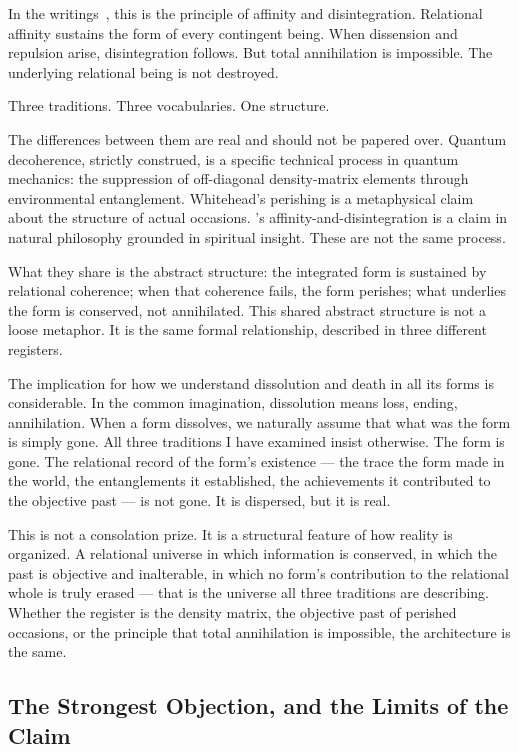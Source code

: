 In the \bahai writings~\citep[Talks 38, 41]{PUP}, this is the principle of affinity and disintegration.
Relational affinity sustains the form of every contingent being.
When dissension and repulsion arise, disintegration follows.
But total annihilation is impossible.
The underlying relational being is not destroyed.

Three traditions.
Three vocabularies.
One structure.

The differences between them are real and should not be papered over.
Quantum decoherence, strictly construed, is a specific technical process in quantum mechanics: the suppression of off-diagonal density-matrix elements through environmental entanglement.
Whitehead's perishing is a metaphysical claim about the structure of actual occasions.
\AbdulBaha's affinity-and-disintegration is a claim in natural philosophy grounded in spiritual insight.
These are not the same process.

What they share is the abstract structure: the integrated form is sustained by relational coherence; when that coherence fails, the form perishes; what underlies the form is conserved, not annihilated.
This shared abstract structure is not a loose metaphor.
It is the same formal relationship, described in three different registers.

The implication for how we understand dissolution and death in all its forms is considerable.
In the common imagination, dissolution means loss, ending, annihilation.
When a form dissolves, we naturally assume that what was the form is simply gone.
All three traditions I have examined insist otherwise.
The form is gone.
The relational record of the form's existence --- the trace the form made in the world, the entanglements it established, the achievements it contributed to the objective past --- is not gone.
It is dispersed, but it is real.

This is not a consolation prize.
It is a structural feature of how reality is organized.
A relational universe in which information is conserved, in which the past is objective and inalterable, in which no form's contribution to the relational whole is truly erased --- that is the universe all three traditions are describing.
Whether the register is the density matrix, the objective past of perished occasions, or the principle that total annihilation is impossible, the architecture is the same.

\subsection*{The Strongest Objection, and the Limits of the Claim}

